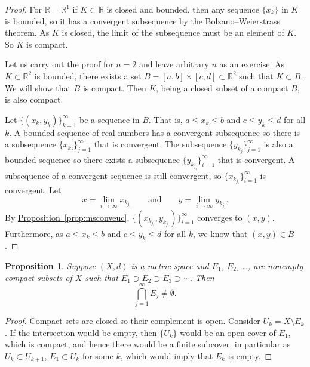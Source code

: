 \documentclass[12pt,openany]{book}
\newcommand{\R}{{\mathbb{R}}}
\theoremstyle{plain}
\newtheorem{prop}[thm]{Proposition}
\theoremstyle{remark}
\theoremstyle{definition}
\theoremstyle{exercise}
\theoremstyle{example}
\newcommand{\propref}[1]{\hyperref[#1]{Proposition~\ref*{#1}}}
\begin{document}
\begin{proof}
For $\R = \R^1$ if $K \subset \R$ is closed and bounded, then
any sequence $\{ x_k \}$ in $K$ is bounded, so it has a convergent
subsequence by
the Bolzano--Weierstrass theorem.
As $K$ is closed, the limit of the subsequence must be an element of
$K$.  So $K$ is compact.

Let us carry out the proof for $n=2$ and leave arbitrary $n$ as an exercise.
As $K \subset \R^2$ is bounded, there exists a set
$B=[a,b]\times[c,d] \subset \R^2$ such that $K \subset B$.  We will show
that $B$ is compact.  Then $K$, being a closed subset of a compact $B$, is
also compact.  

Let $\bigl\{ (x_k,y_k) \bigr\}_{k=1}^\infty$ be a sequence in $B$.  That is,
$a \leq x_k \leq b$ and
$c \leq y_k \leq d$ for all $k$.  A bounded sequence of real numbers
has a convergent
subsequence so there is a subsequence $\{ x_{k_j} \}_{j=1}^\infty$
that is convergent.  The subsequence 
$\{ y_{k_j} \}_{j=1}^\infty$ is also a bounded sequence so there exists
a subsequence
$\{ y_{k_{j_i}} \}_{i=1}^\infty$ that is convergent.  A subsequence of a
convergent sequence is still convergent, so 
$\{ x_{k_{j_i}} \}_{i=1}^\infty$ is convergent.
Let
\begin{equation*}
x = \lim_{i\to\infty} x_{k_{j_i}}
\qquad \text{and} \qquad
y = \lim_{i\to\infty} y_{k_{j_i}} .
\end{equation*}
By \propref{prop:msconveuc},
$\bigl\{ (x_{k_{j_i}},y_{k_{j_i}}) \bigr\}_{i=1}^\infty$ converges to $(x,y)$.
Furthermore, as $a \leq x_k \leq b$ and
$c \leq y_k \leq d$ for all $k$, we know that $(x,y) \in B$.
\end{proof}

\begin{prop}
Suppose $(X,d)$ is a metric space
and $E_1$, $E_2$, \ldots, are
nonempty compact subsets of $X$ such that
$E_1 \supset E_2 \supset E_3 \supset \cdots$.  Then
\begin{equation*}
\bigcap_{j=1}^\infty E_j \not= \emptyset .
\end{equation*}
\end{prop}

\begin{proof}
Compact sets are closed so their complement is open.  Consider
$U_k = X \setminus E_k$.  If the intersection would be empty,
then $\{ U_k \}$ would be an open cover of $E_1$, which is compact,
and hence there would be a finite subcover, in particular
as $U_k \subset U_{k+1}$, $E_1 \subset U_k$ for some $k$, which would imply
that $E_k$ is empty.
\end{proof}
\end{document}
